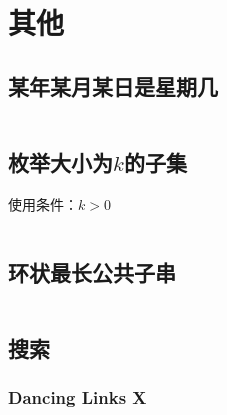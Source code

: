 \documentclass[a4paper]{article}
\newcommand{\cppcode}[1]{
    \inputminted[mathescape]{cpp}{source/#1}
}
\begin{document}




\section{其他}

\subsection{某年某月某日是星期几}

\cppcode{miscellany/what-day-is-today.cpp}

\subsection{枚举大小为$k$的子集}

使用条件：$k > 0$

\cppcode{miscellany/subset-of-size-k.cpp}

\subsection{环状最长公共子串}

\cppcode{miscellany/cyclic-longest-common-string.cpp}

\subsection{搜索}

\subsubsection{Dancing Links X}
\end{document}
